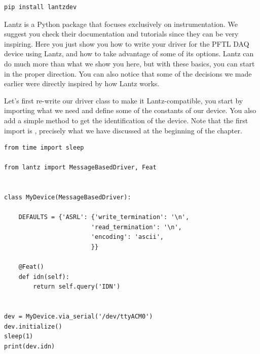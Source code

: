 \begin{verbatim}
pip install lantzdev
\end{verbatim}


Lantz is a Python package that focuses exclusively on instrumentation. We suggest you check their documentation and tutorials since they can be very inspiring. Here you just show you how to write your driver for the {PFTL DAQ} device using Lantz, and how to take advantage of some of its options. Lantz can do much more than what we show you here, but with these basics, you can start in the proper direction. You can also notice that some of the decisions we made earlier were directly inspired by how Lantz works.

Let's first re-write our driver class to make it Lantz-compatible, you start by importing what we need and define some of the constants of our device. You also add a simple method to get the identification of the device. Note that the first import is , precisely what we have discussed at the beginning of the chapter.

\begin{verbatim}
from time import sleep

from lantz import MessageBasedDriver, Feat


class MyDevice(MessageBasedDriver):

    DEFAULTS = {'ASRL': {'write_termination': '\n',
                        'read_termination': '\n',
                        'encoding': 'ascii',
                        }}

    @Feat()
    def idn(self):
        return self.query('IDN')


dev = MyDevice.via_serial('/dev/ttyACM0')
dev.initialize()
sleep(1)
print(dev.idn)
\end{verbatim}

